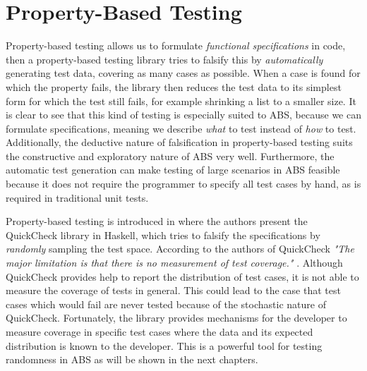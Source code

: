 \section{Property-Based Testing}
\label{sec:proptesting}
Property-based testing allows us to formulate \textit{functional specifications} in code, then a property-based testing library tries to falsify this by \textit{automatically} generating test data, covering as many cases as possible. When a case is found for which the property fails, the library then reduces the test data to its simplest form for which the test still fails, for example shrinking a list to a smaller size. It is clear to see that this kind of testing is especially suited to ABS, because we can formulate specifications, meaning we describe \textit{what} to test instead of \textit{how} to test. Additionally, the deductive nature of falsification in property-based testing suits the constructive and exploratory nature of ABS very well. Furthermore, the automatic test generation can make testing of large scenarios in ABS feasible because it does not require the programmer to specify all test cases by hand, as is required in traditional unit tests.

Property-based testing is introduced in \cite{claessen_quickcheck_2000,claessen_testing_2002} where the authors present the QuickCheck library in Haskell, which tries to falsify the specifications by \textit{randomly} sampling the test space. According to the authors of QuickCheck \textit{"The major limitation is that there is no measurement of test coverage."} \cite{claessen_quickcheck_2000}. Although QuickCheck provides help to report the distribution of test cases, it is not able to measure the coverage of tests in general. This could lead to the case that test cases which would fail are never tested because of the stochastic nature of QuickCheck. Fortunately, the library provides mechanisms for the developer to measure coverage in specific test cases where the data and its expected distribution is known to the developer. This is a powerful tool for testing randomness in ABS as will be shown in the next chapters.

\medskip

